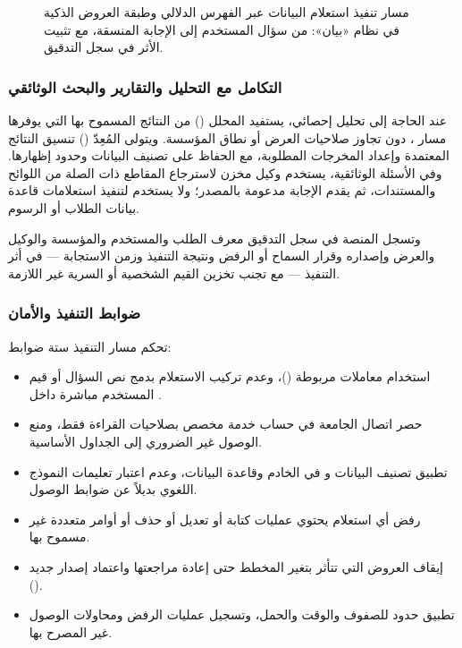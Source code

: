 \begin{figure}[H]
  \centering
  
  \caption{مسار تنفيذ استعلام البيانات عبر الفهرس الدلالي وطبقة العروض الذكية في نظام «بيان»: من سؤال المستخدم إلى الإجابة المنسقة، مع تثبيت الأثر في سجل التدقيق.}
  \label{fig:smart-views-flow}
\end{figure}

\subsubsection{التكامل مع التحليل والتقارير والبحث الوثائقي}

عند الحاجة إلى تحليل إحصائي، يستفيد المحلل () من النتائج المسموح بها التي يوفرها مسار ، دون تجاوز صلاحيات العرض أو نطاق المؤسسة. ويتولى المُعِدّ () تنسيق النتائج المعتمدة وإعداد المخرجات المطلوبة، مع الحفاظ على تصنيف البيانات وحدود إظهارها. وفي الأسئلة الوثائقية، يستخدم وكيل  مخزن  لاسترجاع المقاطع ذات الصلة من اللوائح والمستندات، ثم يقدم الإجابة مدعومة بالمصدر؛ ولا يستخدم  لتنفيذ استعلامات قاعدة بيانات الطلاب أو الرسوم.

وتسجل المنصة في سجل التدقيق معرف الطلب والمستخدم والمؤسسة والوكيل والعرض وإصداره وقرار السماح أو الرفض ونتيجة التنفيذ وزمن الاستجابة — في أثر التنفيذ  — مع تجنب تخزين القيم الشخصية أو السرية غير اللازمة.

\subsubsection{ضوابط التنفيذ والأمان}

تحكم مسار التنفيذ ستة ضوابط:

\begin{itemize}[label=\textcolor{kauprimary}{$\blacktriangleright$},leftmargin=*]
  \item استخدام معاملات  مربوطة ()، وعدم تركيب الاستعلام بدمج نص السؤال أو قيم المستخدم مباشرة داخل .
  \item حصر اتصال الجامعة في حساب خدمة مخصص بصلاحيات القراءة فقط، ومنع الوصول غير الضروري إلى الجداول الأساسية.
  \item تطبيق تصنيف البيانات و في الخادم وقاعدة البيانات، وعدم اعتبار تعليمات النموذج اللغوي بديلاً عن ضوابط الوصول.
  \item رفض أي استعلام يحتوي عمليات كتابة أو تعديل أو حذف أو أوامر متعددة غير مسموح بها.
  \item إيقاف العروض التي تتأثر بتغير المخطط حتى إعادة مراجعتها واعتماد إصدار جديد ().
  \item تطبيق حدود للصفوف والوقت والحمل، وتسجيل عمليات الرفض ومحاولات الوصول غير المصرح بها.
\end{itemize}

